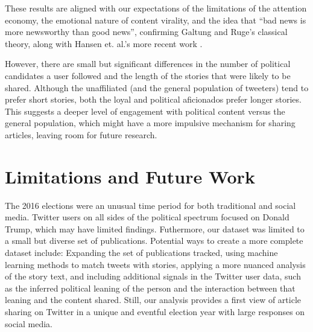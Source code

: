\documentclass[letterpaper]{article}
\begin{document}
These results are aligned with our expectations of the limitations of the attention economy, the emotional nature of content virality, and the idea that ``bad news is more newsworthy than good news'', confirming Galtung and Ruge's classical theory, along with Hansen et. al.'s more recent work \cite{galtung1965structure,hansen2011good}.

However, there are small but significant differences in the number of political candidates a user followed and the length of the stories that were likely to be shared. Although the unaffiliated (and the general population of tweeters) tend to prefer short stories, both the loyal and political aficionados prefer longer stories. This suggests a deeper level of engagement with political content versus the general population, which might have a more impulsive mechanism for sharing articles, leaving room for future research.

\section{Limitations and Future Work}  
The 2016 elections were an unusual time period for both traditional and social media. Twitter users on all sides of the political spectrum focused on Donald Trump, which may have limited findings. Futhermore, our dataset was limited to a small but diverse set of publications. Potential ways to create a more complete dataset include: Expanding the set of publications tracked, using machine learning methods to match tweets with stories, applying a more nuanced analysis of the story text, and including additional signals in the Twitter user data, such as the inferred political leaning of the person and the interaction between that leaning and the content shared. Still, our analysis provides a first view of article sharing on Twitter in a unique and eventful election year with large responses on social media.


 
 
\end{document}

